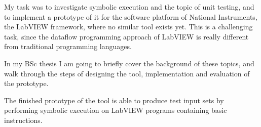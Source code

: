 My task was to investigate symbolic execution and the topic of unit testing, and to implement a prototype of it for the software platform of National Instruments, the LabVIEW framework, where no similar tool exists yet. This is a challenging task, since the dataflow programming approach of LabVIEW is really different from traditional programming languages.

In my BSc thesis I am going to briefly cover the background of these topics, and walk through the steps of designing the tool, implementation and evaluation of the prototype.

The finished prototype of the tool is able to produce test input sets by performing symbolic execution on LabVIEW programs containing basic instructions.
\vfill
\selectthesislanguage

\setcounter{romanPage}{\value{page}}
